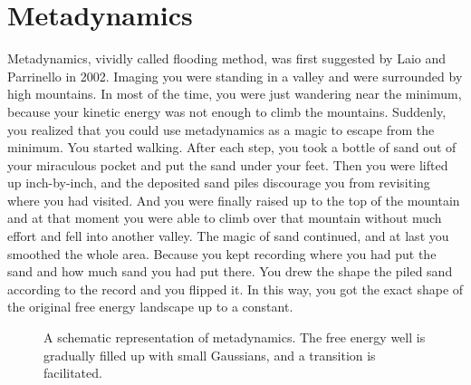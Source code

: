\section{Metadynamics\label{Sec:ES:metadynamics}}
Metadynamics, vividly called flooding method, was first suggested by Laio and Parrinello in 2002.\cite{LaioPNAS2002} 
Imaging you were standing in a valley and were surrounded by high mountains. In most of the time, you were just wandering near the minimum, because your kinetic energy was not enough to climb the mountains. Suddenly, you realized that you could use metadynamics as a magic to escape from the minimum. You started walking. After each step, you took a bottle of sand out of your miraculous pocket and put the sand under your feet. Then you were lifted up inch-by-inch, and the deposited sand piles discourage you from revisiting where you had visited. And you were finally raised up to the top of the mountain and at that moment you were able to climb over that mountain without much effort and fell into another valley. The magic of sand continued, and at last you smoothed the whole area. Because you kept recording where you had put the sand and how much sand you had put there. You drew the shape the piled sand according to the record and you flipped it. In this way, you got the exact shape of the original free energy landscape up to a constant. 
\begin{figure}[htbp]
	\centering
	\caption{A schematic representation of metadynamics. The free energy well is gradually filled up with small Gaussians, and a transition is facilitated.}\label{Fig:ES:metadynamics}
\end{figure}

